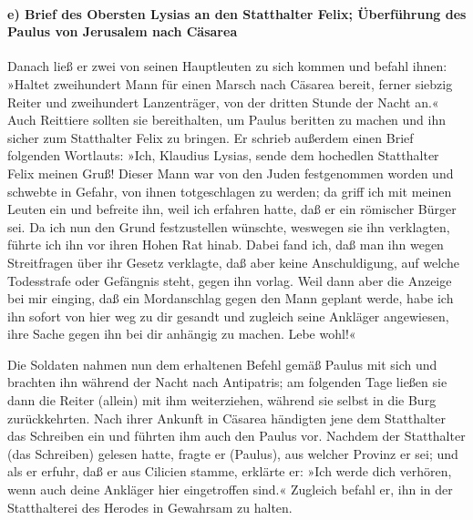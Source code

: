 \hypertarget{e-brief-des-obersten-lysias-an-den-statthalter-felix-uxfcberfuxfchrung-des-paulus-von-jerusalem-nach-cuxe4sarea}{%
\paragraph{e) Brief des Obersten Lysias an den Statthalter Felix;
Überführung des Paulus von Jerusalem nach
Cäsarea}\label{e-brief-des-obersten-lysias-an-den-statthalter-felix-uxfcberfuxfchrung-des-paulus-von-jerusalem-nach-cuxe4sarea}}

 Danach ließ er zwei von seinen Hauptleuten zu sich
kommen und befahl ihnen: »Haltet zweihundert Mann für einen Marsch nach
Cäsarea bereit, ferner siebzig Reiter und zweihundert Lanzenträger, von
der dritten Stunde der Nacht an.«  Auch Reittiere sollten
sie bereithalten, um Paulus beritten zu machen und ihn sicher zum
Statthalter Felix zu bringen.  Er schrieb außerdem einen
Brief folgenden Wortlauts:  »Ich, Klaudius Lysias, sende
dem hochedlen Statthalter Felix meinen Gruß!  Dieser Mann
war von den Juden festgenommen worden und schwebte in Gefahr, von ihnen
totgeschlagen zu werden; da griff ich mit meinen Leuten ein und befreite
ihn, weil ich erfahren hatte, daß er ein römischer Bürger sei.
 Da ich nun den Grund festzustellen wünschte, weswegen
sie ihn verklagten, führte ich ihn vor ihren Hohen Rat hinab.
 Dabei fand ich, daß man ihn wegen Streitfragen über ihr
Gesetz verklagte, daß aber keine Anschuldigung, auf welche Todesstrafe
oder Gefängnis steht, gegen ihn vorlag.  Weil dann aber
die Anzeige bei mir einging, daß ein Mordanschlag gegen den Mann geplant
werde, habe ich ihn sofort von hier weg zu dir gesandt und zugleich
seine Ankläger angewiesen, ihre Sache gegen ihn bei dir anhängig zu
machen. Lebe wohl!«

 Die Soldaten nahmen nun dem erhaltenen Befehl gemäß
Paulus mit sich und brachten ihn während der Nacht nach Antipatris;
 am folgenden Tage ließen sie dann die Reiter (allein)
mit ihm weiterziehen, während sie selbst in die Burg zurückkehrten.
 Nach ihrer Ankunft in Cäsarea händigten jene dem
Statthalter das Schreiben ein und führten ihm auch den Paulus vor.
 Nachdem der Statthalter (das Schreiben) gelesen hatte,
fragte er (Paulus), aus welcher Provinz er sei; und als er erfuhr, daß
er aus Cilicien stamme, erklärte er:  »Ich werde dich
verhören, wenn auch deine Ankläger hier eingetroffen sind.« Zugleich
befahl er, ihn in der Statthalterei des Herodes in Gewahrsam zu halten.

